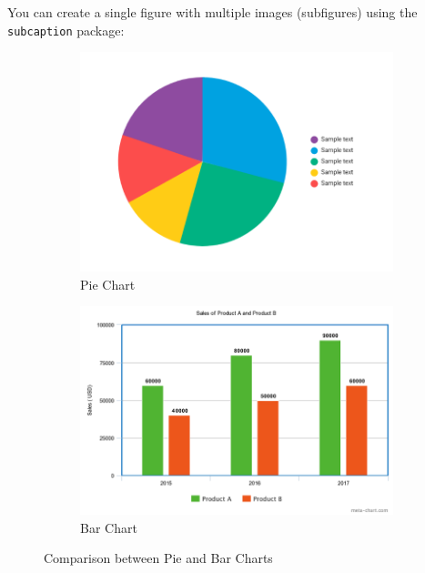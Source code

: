 \documentclass{article}
\begin{document}
You can create a single figure with multiple images (subfigures) using the \texttt{subcaption} package:

\begin{figure}[h]
    \centering
    \begin{subfigure}{0.4\textwidth}
        \includegraphics[width=\linewidth]{Figures/sample-pie.png}
        \caption{Pie Chart}
    \end{subfigure}
    \hspace{0.05\textwidth} %
    \begin{subfigure}{0.4\textwidth}
        \includegraphics[width=\linewidth]{Figures/sample-bar.png}
        \caption{Bar Chart}
    \end{subfigure}
    \caption{Comparison between Pie and Bar Charts}
\end{figure}
\end{document}
